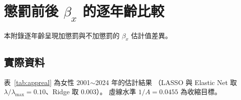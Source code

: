 \documentclass[UTF8, fontset=macnew, a4paper, 12pt]{ctexart}
\renewcommand{\thesection}{\chinese{section}}
\begin{document}
\appendix
\setcounter{section}{0}
\setcounter{table}{0}
\setcounter{figure}{0}
\renewcommand{\thesection}{附錄\Alph{section}}
\renewcommand{\thetable}{\Alph{section}\arabic{table}}
\renewcommand{\thefigure}{\Alph{section}\arabic{figure}}

\section{懲罰前後 $\beta_x$ 的逐年齡比較}

本附錄逐年齡呈現加懲罰與不加懲罰的 $\beta_x$ 估計值差異。

\subsection{實際資料}

表~\ref{tab:appreal} 為女性 2001$\sim$2024 年的估計結果
（LASSO 與 Elastic Net 取 $\lambda/\lambda_{\max}=0.10$、Ridge 取 0.003）。
虛線水準 $1/A=0.0455$ 為收縮目標。
\end{document}
